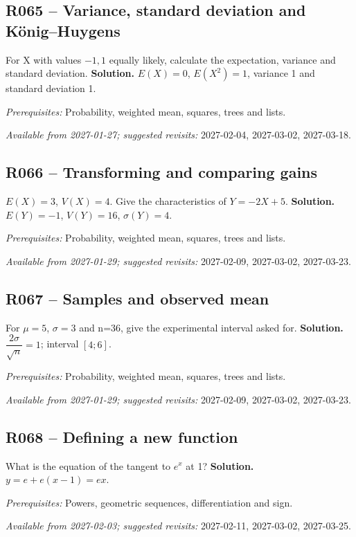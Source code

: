 \subsection*{R065 -- Variance, standard deviation and König--Huygens}\label{R065}
For X with values $-1,1$ equally likely, calculate the expectation, variance and standard deviation.
\ifprof\textbf{Solution.} $E(X)=0$, $E(X^2)=1$, variance 1 and standard deviation 1.\par\textit{Prerequisites:} Probability, weighted mean, squares, trees and lists.\par\textit{Available from 2027-01-27; suggested revisits:} 2027-02-04, 2027-03-02, 2027-03-18.\fi
{}\subsection*{R066 -- Transforming and comparing gains}\label{R066}
$E(X)=3$, $V(X)=4$. Give the characteristics of $Y=-2X+5$.
\ifprof\textbf{Solution.} $E(Y)=-1$, $V(Y)=16$, $\sigma(Y)=4$.\par\textit{Prerequisites:} Probability, weighted mean, squares, trees and lists.\par\textit{Available from 2027-01-29; suggested revisits:} 2027-02-09, 2027-03-02, 2027-03-23.\fi
{}\subsection*{R067 -- Samples and observed mean}\label{R067}
For $\mu=5$, $\sigma=3$ and n=36, give the experimental interval asked for.
\ifprof\textbf{Solution.} $\dfrac{2\sigma}{\sqrt n}=1$; interval $[4;6]$.\par\textit{Prerequisites:} Probability, weighted mean, squares, trees and lists.\par\textit{Available from 2027-01-29; suggested revisits:} 2027-02-09, 2027-03-02, 2027-03-23.\fi
{}\subsection*{R068 -- Defining a new function}\label{R068}
What is the equation of the tangent to $e^x$ at 1?
\ifprof\textbf{Solution.} $y=e+e(x-1)=ex$.\par\textit{Prerequisites:} Powers, geometric sequences, differentiation and sign.\par\textit{Available from 2027-02-03; suggested revisits:} 2027-02-11, 2027-03-02, 2027-03-25.\fi
